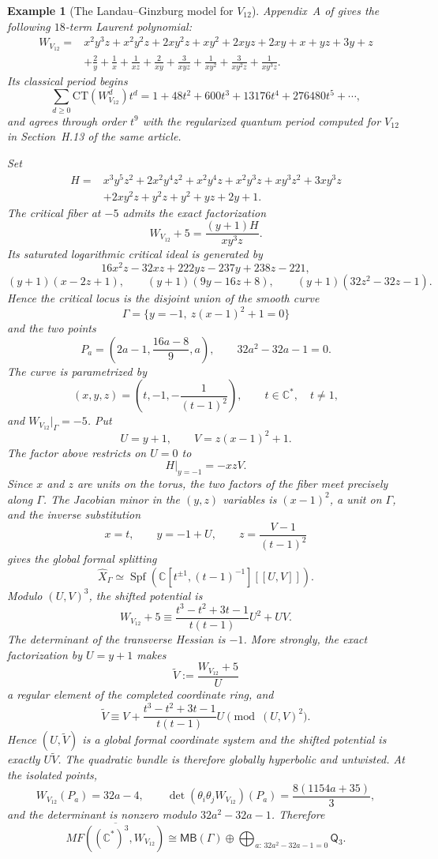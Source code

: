 \documentclass[11pt]{amsart}
\newtheorem{example}{Example}[section]
\newcommand{\MorseCat}[1]{\mathsf{Q}_{#1}}
\newcommand{\MBcat}[1]{\mathsf{MB}(#1)}
\begin{document}
\begin{example}[The Landau--Ginzburg model for $V_{12}$]
Appendix~A of \cite{CoatesCortiGalkinKasprzyk2016} gives the following
$18$-term Laurent polynomial:
\[
\begin{aligned}
W_{V_{12}}={}&x^2y^3z+x^2y^2z+2xy^2z+xy^2+2xyz+2xy+x+yz+3y+z\\
&+\frac2y+\frac1x+\frac1{xz}+\frac2{xy}+\frac3{xyz}
+\frac1{xy^2}+\frac3{xy^2z}+\frac1{xy^3z}.
\end{aligned}
\]
Its classical period begins
\[
\sum_{d\geq0}\mathrm{CT}(W_{V_{12}}^d)t^d
=1+48t^2+600t^3+13176t^4+276480t^5+\cdots,
\]
and agrees through order $t^9$ with the regularized quantum period computed
for $V_{12}$ in Section~H.13 of the same article.

Set
\[
\begin{aligned}
H={}&x^3y^5z^2+2x^2y^4z^2+x^2y^4z+x^2y^3z
+xy^3z^2+3xy^3z\\
&+2xy^2z+y^2z+y^2+yz+2y+1.
\end{aligned}
\]
The critical fiber at $-5$ admits the exact factorization
\[
W_{V_{12}}+5=\frac{(y+1)H}{xy^3z}.
\]
Its saturated logarithmic critical ideal is generated by
\[
16x^2z-32xz+222yz-237y+238z-221,
\]
\[
(y+1)(x-2z+1),
\qquad
(y+1)(9y-16z+8),
\qquad
(y+1)(32z^2-32z-1).
\]
Hence the critical locus is the disjoint union of the smooth curve
\[
\Gamma=\{y=-1,\ z(x-1)^2+1=0\}
\]
and the two points
\[
P_a=\left(2a-1,\frac{16a-8}{9},a\right),
\qquad
32a^2-32a-1=0.
\]
The curve is parametrized by
\[
(x,y,z)=\left(t,-1,-\frac1{(t-1)^2}\right),
\qquad
t\in\mathbb C^*,\quad t\neq1,
\]
and $W_{V_{12}}|_\Gamma=-5$. Put
\[
U=y+1,
\qquad
V=z(x-1)^2+1.
\]
The factor above restricts on $U=0$ to
\[
H|_{y=-1}=-xzV.
\]
Since $x$ and $z$ are units on the torus, the two factors of the fiber meet
precisely along $\Gamma$.
The Jacobian minor in the $(y,z)$ variables is $(x-1)^2$, a unit on
$\Gamma$, and the inverse substitution
\[
x=t,
\qquad
y=-1+U,
\qquad
z=\frac{V-1}{(t-1)^2}
\]
gives the global formal splitting
\[
\widehat X_\Gamma
\simeq
\operatorname{Spf}\!\left(
\mathbb C[t^{\pm1},(t-1)^{-1}][[U,V]]
\right).
\]
Modulo $(U,V)^3$, the shifted potential is
\[
W_{V_{12}}+5
\equiv
\frac{t^3-t^2+3t-1}{t(t-1)}U^2+UV.
\]
The determinant of the transverse Hessian is $-1$. More strongly, the exact
factorization by $U=y+1$ makes
\[
\widetilde V:=\frac{W_{V_{12}}+5}{U}
\]
a regular element of the completed coordinate ring, and
\[
\widetilde V
\equiv
V+\frac{t^3-t^2+3t-1}{t(t-1)}U
\pmod{(U,V)^2}.
\]
Hence $(U,\widetilde V)$ is a global formal coordinate system and the shifted
potential is exactly $U\widetilde V$. The quadratic bundle is therefore
globally hyperbolic and untwisted. At the isolated points,
\[
W_{V_{12}}(P_a)=32a-4,
\qquad
\det(\theta_i\theta_jW_{V_{12}})(P_a)
=\frac{8(1154a+35)}{3},
\]
and the determinant is nonzero modulo $32a^2-32a-1$. Therefore
\[
\overline{MF((\mathbb{C}^*)^3,W_{V_{12}})}
\cong
\MBcat{\Gamma}
\oplus
\bigoplus_{a:\,32a^2-32a-1=0}\MorseCat{3}.
\]
\end{example}
\end{document}

